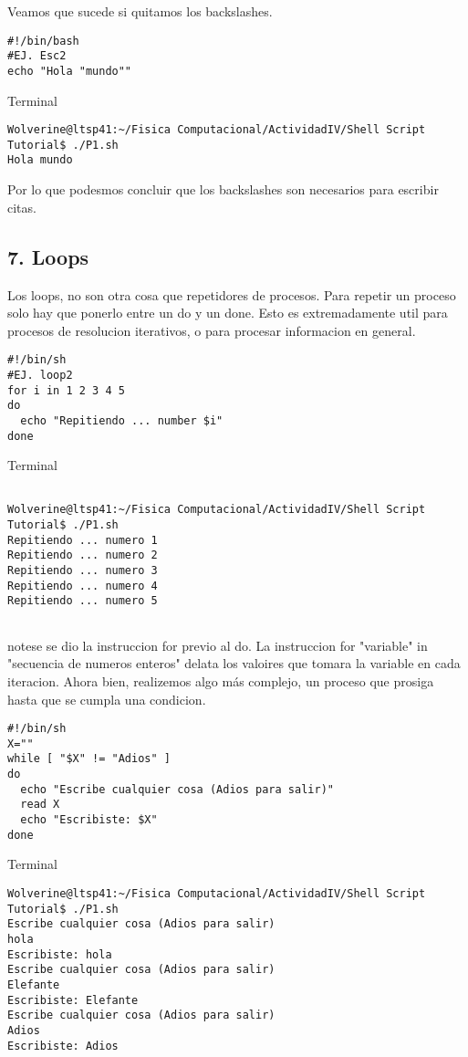 \documentclass[a4paper]{article}
\begin{document}
Veamos que sucede si quitamos los backslashes.

\begin{verbatim}
#!/bin/bash
#EJ. Esc2
echo "Hola "mundo""

\end{verbatim}

Terminal
\begin{verbatim}
Wolverine@ltsp41:~/Fisica Computacional/ActividadIV/Shell Script Tutorial$ ./P1.sh
Hola mundo
\end{verbatim}

Por lo que podesmos concluir que los backslashes son necesarios para escribir citas.

\subsection{7. Loops}

Los loops, no son otra cosa que repetidores de procesos. Para repetir un proceso solo hay que ponerlo entre un do y un done. Esto es extremadamente util para procesos de resolucion iterativos, o para procesar informacion en general.

\begin{verbatim}
#!/bin/sh
#EJ. loop2
for i in 1 2 3 4 5
do
  echo "Repitiendo ... number $i"
done
\end{verbatim}

Terminal

\begin{verbatim}

Wolverine@ltsp41:~/Fisica Computacional/ActividadIV/Shell Script Tutorial$ ./P1.sh
Repitiendo ... numero 1
Repitiendo ... numero 2
Repitiendo ... numero 3
Repitiendo ... numero 4
Repitiendo ... numero 5


\end{verbatim}

notese se dio la instruccion for previo al do. La instruccion for "variable" in "secuencia de numeros enteros" delata los valoires que tomara la variable en cada iteracion. Ahora bien, realizemos algo más complejo, un proceso que prosiga hasta que se cumpla una condicion. 

\begin{verbatim}
#!/bin/sh
X=""
while [ "$X" != "Adios" ]
do
  echo "Escribe cualquier cosa (Adios para salir)"
  read X
  echo "Escribiste: $X"
done
\end{verbatim}
Terminal
\begin{verbatim}
Wolverine@ltsp41:~/Fisica Computacional/ActividadIV/Shell Script Tutorial$ ./P1.sh
Escribe cualquier cosa (Adios para salir)
hola
Escribiste: hola
Escribe cualquier cosa (Adios para salir)
Elefante
Escribiste: Elefante
Escribe cualquier cosa (Adios para salir)
Adios
Escribiste: Adios
\end{verbatim}
\end{document}
